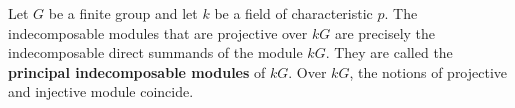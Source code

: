 Let $G$ be a finite group and let $k$ be a field of characteristic $p$. The indecomposable modules that are projective over $kG$ are precisely the indecomposable direct summands of the module $kG$. They are called the \textbf{principal indecomposable modules} of $kG$. Over $kG$, the notions of projective and injective module coincide.
